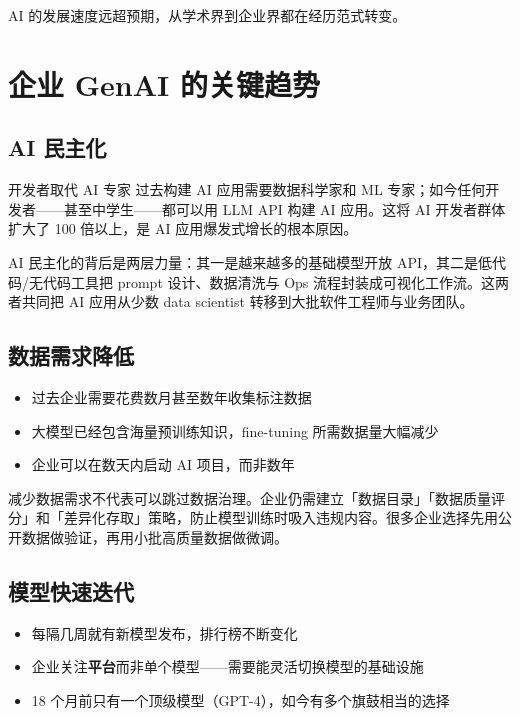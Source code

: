 \documentclass[a4paper]{article}
\begin{document}
AI 的发展速度远超预期，从学术界到企业界都在经历范式转变。

\section{企业 GenAI 的关键趋势}

\subsection{AI 民主化}

\begin{importantbox}{开发者取代 AI 专家}
过去构建 AI 应用需要数据科学家和 ML 专家；如今任何开发者——甚至中学生——都可以用 LLM API 构建 AI 应用。这将 AI 开发者群体扩大了 100 倍以上，是 AI 应用爆发式增长的根本原因。
\end{importantbox}

AI 民主化的背后是两层力量：其一是越来越多的基础模型开放 API，其二是低代码/无代码工具把 prompt 设计、数据清洗与 Ops 流程封装成可视化工作流。这两者共同把 AI 应用从少数 data scientist 转移到大批软件工程师与业务团队。

\subsection{数据需求降低}

\begin{itemize}
    \item 过去企业需要花费数月甚至数年收集标注数据
    \item 大模型已经包含海量预训练知识，fine-tuning 所需数据量大幅减少
    \item 企业可以在数天内启动 AI 项目，而非数年
\end{itemize}

减少数据需求不代表可以跳过数据治理。企业仍需建立「数据目录」「数据质量评分」和「差异化存取」策略，防止模型训练时吸入违规内容。很多企业选择先用公开数据做验证，再用小批高质量数据做微调。

\subsection{模型快速迭代}

\begin{itemize}
    \item 每隔几周就有新模型发布，排行榜不断变化
    \item 企业关注\textbf{平台}而非单个模型——需要能灵活切换模型的基础设施
    \item 18 个月前只有一个顶级模型（GPT-4），如今有多个旗鼓相当的选择
\end{itemize}
\end{document}
